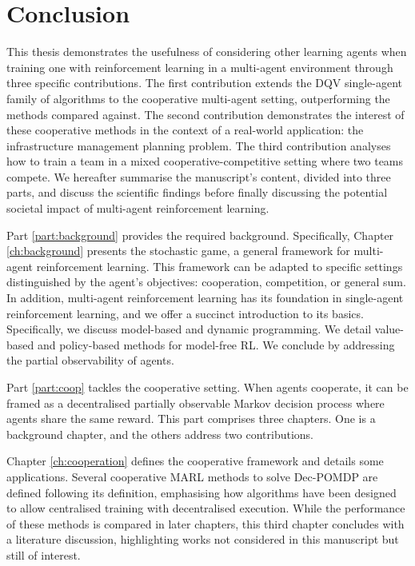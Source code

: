 \chapter{Conclusion}\label{ch:conclusion}

This thesis demonstrates the usefulness of considering other learning agents when training one with reinforcement learning in a multi-agent environment through three specific contributions.
The first contribution extends the DQV single-agent family of algorithms to the cooperative multi-agent setting, outperforming the methods compared against.
The second contribution demonstrates the interest of these cooperative methods in the context of a real-world application: the infrastructure management planning problem.
The third contribution analyses how to train a team in a mixed cooperative-competitive setting where two teams compete.
We hereafter summarise the manuscript's content, divided into three parts, and discuss the scientific findings before finally discussing the potential societal impact of multi-agent reinforcement learning.

Part \ref{part:background} provides the required background.
Specifically, Chapter \ref{ch:background} presents the stochastic game, a general framework for multi-agent reinforcement learning. 
This framework can be adapted to specific settings distinguished by the agent's objectives: cooperation, competition, or general sum.
In addition, multi-agent reinforcement learning has its foundation in single-agent reinforcement learning, and we offer a succinct introduction to its basics.
Specifically, we discuss model-based and dynamic programming.
We detail value-based and policy-based methods for model-free RL.
We conclude by addressing the partial observability of agents.

Part \ref{part:coop} tackles the cooperative setting.
When agents cooperate, it can be framed as a decentralised partially observable Markov decision process where agents share the same reward.
This part comprises three chapters.
One is a background chapter, and the others address two contributions.

Chapter \ref{ch:cooperation} defines the cooperative framework and details some applications.
Several cooperative MARL methods to solve Dec-POMDP are defined following its definition, emphasising how algorithms have been designed to allow centralised training with decentralised execution.
While the performance of these methods is compared in later chapters, this third chapter concludes with a literature discussion, highlighting works not considered in this manuscript but still of interest.

